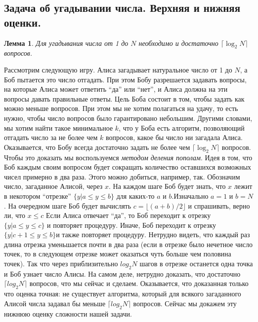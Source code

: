 \documentclass{article}
\newtheorem{lemma}{Лемма}
\begin{document}
\subsection{Задача об угадывании числа. Верхняя и нижняя оценки.}
\begin{lemma}
Для угадывания числа от 1 до $N$ необходимо и достаточно $\lceil \log_2{N} \rceil$ вопросов.
\end{lemma}
Рассмотрим следующую игру. Алиса загадывает натуральное число от 1 до $N$, а Боб пытается это число отгадать. При этом Бобу разрешается задавать вопросы, на которые Алиса может ответить “да” или “нет”, и Алиса должна на эти вопросы давать правильные ответы. Цель Боба состоит в том, чтобы задать как можно меньше вопросов. При этом мы не хотим полагаться на удачу, то есть нужно, чтобы число вопросов было гарантировано небольшим. Другими словами, мы хотим найти такое минимальное $k$, что у Боба есть алгоритм, позволяющий отгадать число за не более чем $k$ вопросов, какое бы число ни загадала Алиса.
\newline
Оказывается, что Бобу всегда достаточно задать не более чем $\lceil \log_2{N} \rceil$ вопросов. Чтобы это доказать мы воспользуемся \textit{методом деления пополам}. Идея в том, что Боб каждым своим вопросом будет сокращать количество оставшихся возможных чисел примерно в два раза. Этого можно добиться, например, так. Обозначим число, загаданное Алисой, через $x$. На каждом шаге Боб будет знать, что $x$ лежит в некотором “отрезке” $\{y | a \leqslant y \leqslant b\}$ для каких-то $a$ и $b$.Изначально $a=1$ и $b=N$. На очередном шаге Боб будет вычислять $c = \lfloor (a + b)/2 \rfloor$ и спрашивать, верно ли, что $x \leqslant c$ Если Алиса отвечает “да”, то Боб переходит к отрезку $\{y | a \leqslant y \leqslant c\}$ и повторяет процедуру. Иначе, Боб переходит к отрезку $\{y | c+1 \leqslant y \leqslant b\}$и также повторяет процедуру. Нетрудно видеть, что каждый раз длина отрезка уменьшается почти в два раза (если в отрезке было нечетное число точек, то в следующем отрезке может оказаться чуть больше чем половина точек). Так что через приблизительно $log_2 N$ шагов в отрезке останется одна точка и Боб узнает число Алисы. На самом деле, нетрудно доказать, что достаточно $\lceil log_2 N \rceil$ вопросов, что мы сейчас и сделаем.
\newline
Оказывается, что доказанная только что оценка точная: не существует алгоритма, который для всякого загаданного Алисой числа задавал бы меньше $\lceil log_2 N \rceil$ вопросов. Сейчас мы докажем эту нижнюю оценку сложности нашей задачи.
\end{document}
